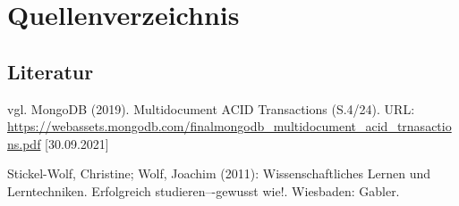 

%
% 
\newpage
\thispagestyle{empty}
\section{Quellenverzeichnis}
\subsection{Literatur}
\renewcommand{\refname}{} %
\begin{thebibliography}{SW11} %
   vgl. MongoDB (2019). Multidocument ACID Transactions (S.4/24). URL: \url{https://webassets.mongodb.com/finalmongodb_multidocument_acid_trnasactions.pdf} [30.09.2021]

   Stickel-Wolf, Christine; Wolf, Joachim (2011): Wissenschaftliches Lernen und Lerntechniken. Erfolgreich studieren–-gewusst wie!. Wiesbaden: Gabler.
\end{thebibliography}


